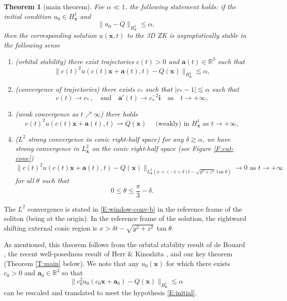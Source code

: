 \documentclass[12pt,letterpaper]{amsart}
\newtheorem{theorem}{Theorem}
\theoremstyle{remark}
\numberwithin{equation}{section}
\numberwithin{theorem}{section}
\numberwithin{table}{section}
\begin{document}
\begin{theorem}[main theorem]
For $\alpha \ll 1$, the following statement holds:  if the initial condition $u_0\in H_{\mathbf{x}}^1$ and 
\begin{equation}
\label{E:initial}
\|u_0 - Q \|_{H_{\mathbf{x}}^1} \leq \alpha,
\end{equation}
then the corresponding solution $u(\mathbf{x},t)$ to the 3D ZK  is \emph{asymptotically stable} in the following sense
\begin{enumerate}
\item (orbital stability) there exist trajectories $c(t)>0$ and $\mathbf{a}(t)\in \mathbb{R}^3$ such that 
$$
\| c(t)^2 u(c(t)\mathbf{x} + \mathbf{a}(t),t) - Q(\mathbf{x}) \|_{H_{\mathbf{x}}^1} \lesssim \alpha,
$$
\item (convergence of trajectories) there exists $c_*$ such that $|c_*-1| \lesssim \alpha$ such that 
$$
c(t) \to c_* \,,  \quad \text{and} \quad \mathbf{a}'(t) \to c_*^{-2} \mathbf{i} \quad \text{as} \quad t\to +\infty, 
$$
\item (weak convergence as $t\nearrow \infty$) there holds
\begin{equation}
\label{E:main-weak}
c(t)^2 u(c(t) \mathbf{x} + \mathbf{a}(t),t) \rightharpoonup Q(\mathbf{x}) \quad \text{ (weakly) in } H_{\mathbf{x}}^1 \text{ as }t\to +\infty,
\end{equation}
\item ($L^2$ strong convergence in  conic right-half space) for any $\delta\gtrsim \alpha$, we have strong convergence in $L^2_{\mathbf{x}}$ on the conic right-half space (see Figure \ref{F:cut-cone})
\begin{equation}
\label{E:window-conv-b}
\| c(t)^2 u(c(t) \mathbf{x} + \mathbf{a}(t),t) - Q(\mathbf{x}) \|_{L^2_{\mathbf{x}}(x> (-1+\delta) t -\sqrt{y^2+z^2}\tan \theta )} \to 0 \text{ as } t\to +\infty
\end{equation}
for all $\theta$ such that 
$$
0\leq  \theta \leq \frac{\pi}{3}-\delta.
$$
\end{enumerate}
\end{theorem}
The $L^2$ convergence is stated in \eqref{E:window-conv-b} in the reference frame of the soliton (being at the origin). In the reference frame of the solution, the rightward shifting external conic region is  $x> \delta t -\sqrt{y^2+z^2} \, \tan \theta$. 

As mentioned, this theorem follows from the orbital stability result of de Bouard \cite{deB}, the recent well-posedness result of Herr \& Kinoshita \cite{HK}, and our key theorem %
(Theorem \ref{T:main} below).    We note that any $u_0(\mathbf{x})$ for which there exists $c_0>0$ and $\mathbf{a}_0 \in \mathbb{R}^3$ so that
$$\| c_0^2 u_0(c_0 \mathbf{x} + \mathbf{a}_0) - Q(\mathbf{x}) \|_{H_{\mathbf{x}}^1} \lesssim \alpha$$
can be rescaled and translated to meet the hypothesis \eqref{E:initial}.  
\end{document}
